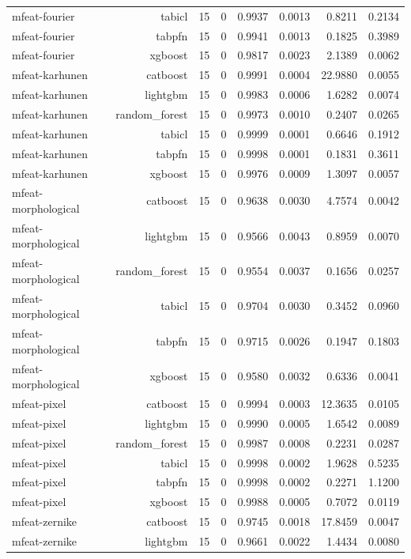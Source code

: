 \begin{table}[htbp]
\begin{tabular}{lrrrrrrr}
mfeat-fourier & tabicl & 15 & 0 & 0.9937 & 0.0013 & 0.8211 & 0.2134 \\
mfeat-fourier & tabpfn & 15 & 0 & 0.9941 & 0.0013 & 0.1825 & 0.3989 \\
mfeat-fourier & xgboost & 15 & 0 & 0.9817 & 0.0023 & 2.1389 & 0.0062 \\
mfeat-karhunen & catboost & 15 & 0 & 0.9991 & 0.0004 & 22.9880 & 0.0055 \\
mfeat-karhunen & lightgbm & 15 & 0 & 0.9983 & 0.0006 & 1.6282 & 0.0074 \\
mfeat-karhunen & random\_forest & 15 & 0 & 0.9973 & 0.0010 & 0.2407 & 0.0265 \\
mfeat-karhunen & tabicl & 15 & 0 & 0.9999 & 0.0001 & 0.6646 & 0.1912 \\
mfeat-karhunen & tabpfn & 15 & 0 & 0.9998 & 0.0001 & 0.1831 & 0.3611 \\
mfeat-karhunen & xgboost & 15 & 0 & 0.9976 & 0.0009 & 1.3097 & 0.0057 \\
mfeat-morphological & catboost & 15 & 0 & 0.9638 & 0.0030 & 4.7574 & 0.0042 \\
mfeat-morphological & lightgbm & 15 & 0 & 0.9566 & 0.0043 & 0.8959 & 0.0070 \\
mfeat-morphological & random\_forest & 15 & 0 & 0.9554 & 0.0037 & 0.1656 & 0.0257 \\
mfeat-morphological & tabicl & 15 & 0 & 0.9704 & 0.0030 & 0.3452 & 0.0960 \\
mfeat-morphological & tabpfn & 15 & 0 & 0.9715 & 0.0026 & 0.1947 & 0.1803 \\
mfeat-morphological & xgboost & 15 & 0 & 0.9580 & 0.0032 & 0.6336 & 0.0041 \\
mfeat-pixel & catboost & 15 & 0 & 0.9994 & 0.0003 & 12.3635 & 0.0105 \\
mfeat-pixel & lightgbm & 15 & 0 & 0.9990 & 0.0005 & 1.6542 & 0.0089 \\
mfeat-pixel & random\_forest & 15 & 0 & 0.9987 & 0.0008 & 0.2231 & 0.0287 \\
mfeat-pixel & tabicl & 15 & 0 & 0.9998 & 0.0002 & 1.9628 & 0.5235 \\
mfeat-pixel & tabpfn & 15 & 0 & 0.9998 & 0.0002 & 0.2271 & 1.1200 \\
mfeat-pixel & xgboost & 15 & 0 & 0.9988 & 0.0005 & 0.7072 & 0.0119 \\
mfeat-zernike & catboost & 15 & 0 & 0.9745 & 0.0018 & 17.8459 & 0.0047 \\
mfeat-zernike & lightgbm & 15 & 0 & 0.9661 & 0.0022 & 1.4434 & 0.0080 \\

\end{tabular}
\end{table}
